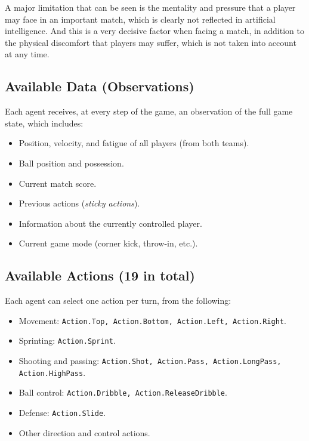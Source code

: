 A major limitation that can be seen is the mentality and pressure that a player may face in an important match, which is clearly not reflected in artificial intelligence. And this is a very decisive factor when facing a match, in addition to the physical discomfort that players may suffer, which is not taken into account at any time.

\subsection*{Available Data (Observations)}

Each agent receives, at every step of the game, an observation of the full game state, which includes:

\begin{itemize}
    \item Position, velocity, and fatigue of all players (from both teams).
    \item Ball position and possession.
    \item Current match score.
    \item Previous actions (\textit{sticky actions}).
    \item Information about the currently controlled player.
    \item Current game mode (corner kick, throw-in, etc.).
\end{itemize}

\vspace{0.3cm}

\subsection*{Available Actions (19 in total)}

Each agent can select one action per turn, from the following:

\begin{itemize}
    \item Movement: \texttt{Action.Top, Action.Bottom, Action.Left, Action.Right}.
    \item Sprinting: \texttt{Action.Sprint}.
    \item Shooting and passing: \texttt{Action.Shot, Action.Pass, Action.LongPass, Action.HighPass}.
    \item Ball control: \texttt{Action.Dribble, Action.ReleaseDribble}.
    \item Defense: \texttt{Action.Slide}.
    \item Other direction and control actions.
\end{itemize}

